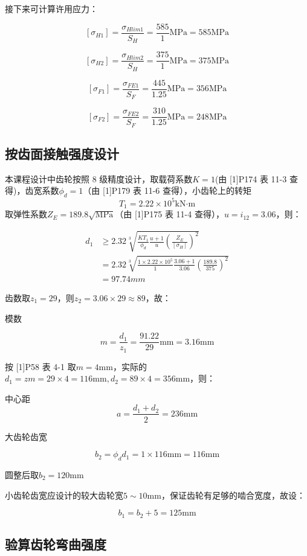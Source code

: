 \documentclass[12pt]{ctexart}
\begin{document}
接下来可计算许用应力：

$$[\sigma_{H1}]=\frac{\sigma_{Hlim1}}{S_H}=\frac{585}{1}\text{MPa}=585\text{MPa}$$

$$[\sigma_{H2}]=\frac{\sigma_{Hlim2}}{S_H}=\frac{375}{1}\text{MPa}=375\text{MPa}$$

$$[\sigma_{F1}]=\frac{\sigma_{FE1}}{S_F}=\frac{445}{1.25}\text{MPa}=356\text{MPa}$$

$$[\sigma_{F2}]=\frac{\sigma_{FE2}}{S_F}=\frac{310}{1.25}\text{MPa}=248\text{MPa}$$

\subsection{按齿面接触强度设计}

本课程设计中齿轮按照 8 级精度设计，取载荷系数$K=1$(由 [1]P174 表 11-3 查得)，齿宽系数$\phi_d=1$（由 [1]P179 表 11-6 查得），小齿轮上的转矩
$$T_1 = 2.22 \times 10^5 \text{kN·m}$$
取弹性系数$Z_E = 189.8 \sqrt{\text{MPa}}$（由 [1]P175 表 11-4 查得），$u=i_{12}=3.06$，则：

\begin{align*}
    d_1 & \ge 2.32\sqrt[3]{\frac{KT_1}{\phi_d}\frac{u+1}{u}\left(\frac{Z_E}{[\sigma_{H}]}\right)^2}\\
    & = 2.32\sqrt[3]{\frac{1\times 2.22 \times 10^5}{1}\frac{3.06+1}{3.06}\left(\frac{189.8}{375}\right)^2} \\
    & =97.74 mm 
\end{align*}

齿数取$z_1=29$，则$z_2=3.06\times 29\approx 89$，故：

模数

$$m=\frac{d_1}{z_1}=\frac{91.22}{29}\text{mm}=3.16\text{mm}$$

按 [1]P58 表 4-1 取$m=4\text{mm}$，实际的$d_1 = zm=29\times 4=116\text{mm}, d_2=89\times 4=356\text{mm}$，则：

中心距$$a = \frac{d_1+d_2}{2} = 236\text{mm}$$


大齿轮齿宽

$$b_2=\phi_dd_1=1\times 116\text{mm}=116\text{mm}$$

圆整后取$b_2=120\text{mm}$

小齿轮齿宽应设计的较大齿轮宽$5\sim 10 \text{mm}$，保证齿轮有足够的啮合宽度，故设：

$$b_1 = b_2 + 5 = 125 \text{mm}$$


\subsection{验算齿轮弯曲强度}
\end{document}
